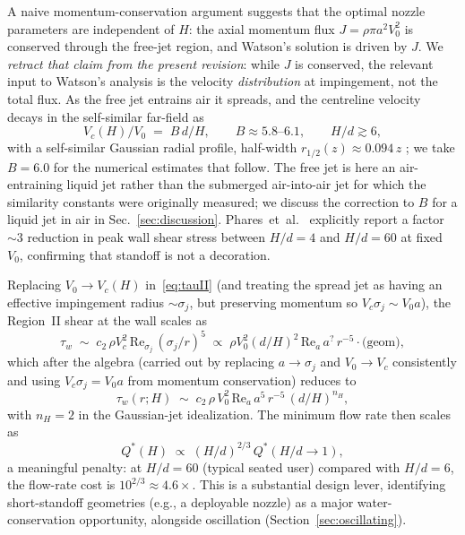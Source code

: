 \documentclass[aps,prfluids,reprint,amsmath,amssymb,floatfix]{revtex4-2}
\newcommand{\Rey}{\mathrm{Re}}
\begin{document}
A naive momentum-conservation argument suggests that the optimal nozzle
parameters are independent of $H$: the axial momentum flux
$J = \rho \pi a^2 V_0^2$ is conserved through the free-jet region, and
Watson's solution is driven by $J$. We \emph{retract that claim from the
present revision}: while $J$ is conserved, the relevant input to Watson's
analysis is the velocity \emph{distribution} at impingement, not the
total flux. As the free jet entrains air it spreads, and the centreline
velocity decays in the self-similar far-field
\citep{HusseinCappGeorge1994,PopeBook} as
\begin{equation}
  V_c(H)/V_0 \;=\; B\,d/H, \qquad B \approx 5.8\text{--}6.1,
  \qquad H/d \gtrsim 6,
  \label{eq:Vcjet}
\end{equation}
with a self-similar Gaussian radial profile, half-width
$r_{1/2}(z) \approx 0.094\,z$
\citep{HusseinCappGeorge1994,PopeBook}; we take $B = 6.0$ for the
numerical estimates that follow. The free jet is here an air-entraining
liquid jet rather than the submerged air-into-air jet for which the
similarity constants were originally measured; we discuss the
correction to $B$ for a liquid jet in air in Sec.~\ref{sec:discussion}.
Phares~et~al.~\citep{Phares2000} explicitly report a factor $\sim 3$
reduction in peak wall shear stress between $H/d = 4$ and $H/d = 60$ at
fixed $V_0$, confirming that standoff is not a decoration.

Replacing $V_0 \to V_c(H)$ in~\eqref{eq:tauII} (and treating the spread
jet as having an effective impingement radius $\sim \sigma_j$, but
preserving momentum so $V_c \sigma_j \sim V_0 a$), the Region~II shear
at the wall scales as
\begin{equation}
  \tau_w \;\sim\; c_2\,\rho V_c^2\,\Rey_{\sigma_j}\,(\sigma_j/r)^5
  \;\propto\; \rho V_0^2 (d/H)^{2}\,\Rey_a\,a^{?}\,r^{-5} \cdot \text{(geom)},
\end{equation}
which after the algebra (carried out by replacing $a \to \sigma_j$ and
$V_0 \to V_c$ consistently and using $V_c \sigma_j = V_0 a$ from
momentum conservation) reduces to
\begin{equation}
  \tau_w(r;H) \;\sim\; c_2\,\rho\,V_0^2\,\Rey_a\,a^5\,r^{-5}\,(d/H)^{n_H},
  \label{eq:tauIIH}
\end{equation}
with $n_H = 2$ in the Gaussian-jet idealization. The minimum flow rate
then scales as
\begin{equation}
  Q^*(H) \;\propto\; (H/d)^{2/3}\,Q^*(H/d \to 1),
  \label{eq:QstarH}
\end{equation}
a meaningful penalty: at $H/d = 60$ (typical seated user) compared with
$H/d = 6$, the flow-rate cost is $10^{2/3} \approx 4.6\times$. This is a
substantial design lever, identifying short-standoff geometries (e.g., a
deployable nozzle) as a major water-conservation opportunity, alongside
oscillation (Section~\ref{sec:oscillating}).
\end{document}
